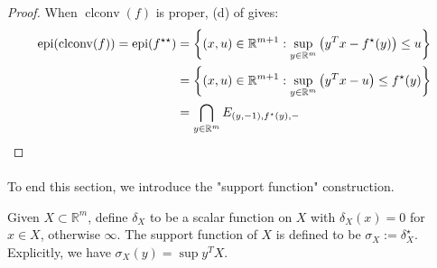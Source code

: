 \begin{proof}
	When $\operatorname{clconv}(f)$ is proper, (d) of  gives:
	\begin{align*}
		\operatorname{epi}(\operatorname{clconv}(f)) =\operatorname{epi}(f^{\star\star}) & =\left\{
		(x,u)\in \mathbb{R}^{m+1}:\sup_{y\in \mathbb{R}^m} \left(y^Tx-f^\star(y)\right)\leq u
		\right\}                                                                                                                                         \\
		                                                                                 & =\left\{
		(x,u)\in \mathbb{R}^{m+1}:\sup_{y\in \mathbb{R}^m} \left(y^Tx-u\right)\leq f^\star(y)
		\right\}                                                                                                                                         \\
		                                                                                 & =\bigcap_{y\in \mathbb{R}^m}E_{(y,-1),f^\star(y),-}\qedhere{}
	\end{align*}
\end{proof}

\paragraph{}To end this section, we introduce the "support function" construction.

\begin{defn}\label{defn:025-indicator-function}
	Given $X\subset \mathbb{R}^m$, define $\delta_X$ to be a scalar function on $X$ with $\delta_X(x)=0$ for $x\in X$, otherwise $\infty$. The support function of $X$ is defined to be $\sigma_X:=\delta_X^{\star}$. Explicitly, we have $\sigma_X(y)=\sup y^TX$.
\end{defn}

